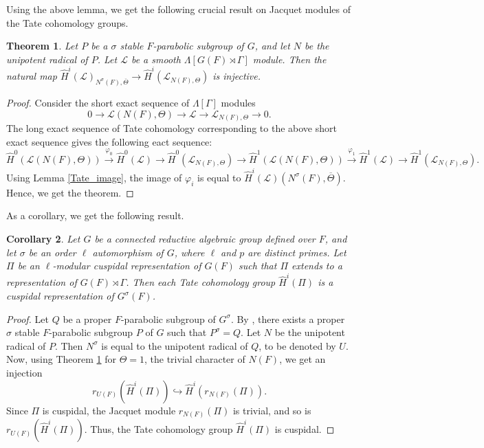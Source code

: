 \documentclass[10pt, reqno]{amsart}
\theoremstyle{plain}
\numberwithin{equation}{section} \newcommand{\di}{\operatorname{dim}}
\newtheorem{theorem}{Theorem}[subsection]
\newtheorem{corollary}[theorem]{Corollary}
\begin{document}
Using the above lemma, we get the following crucial result on Jacquet
modules of the Tate cohomology groups.
\begin{theorem}\label{Jacquet_tate_injective}
Let $P$ be a $\sigma$ stable $F$-parabolic subgroup of
$G$, and let $N$ be the unipotent radical of $P$. Let $\mathcal{L}$
be a smooth $\Lambda[G(F)\rtimes \Gamma]$
module. Then the natural map 
$\widehat{H}^i(\mathcal{L})_{N^\sigma(F),
\overline{\Theta}} \rightarrow
\widehat{H}^i(\mathcal{L}_{N(F),\Theta})$ is injective.  
\end{theorem}
\begin{proof}
Consider the short exact sequence of $\Lambda[\Gamma]$ modules
$$ 0\longrightarrow \mathcal{L}(N(F),\Theta)
\longrightarrow \mathcal{L}\longrightarrow
\mathcal{L}_{N(F),\Theta}\longrightarrow 0. $$ The long exact sequence
of Tate cohomology corresponding to the above short exact sequence gives
the following eact sequence:
$$ \widehat{H}^0(\mathcal{L}(N(F),\Theta))\xrightarrow
{\varphi_0}\widehat{H}^0(\mathcal{L})\rightarrow
\widehat{H}^0(\mathcal{L}_{N(F),\Theta})\rightarrow
\widehat{H}^1(\mathcal{L}(N(F),\Theta))\xrightarrow
{\varphi_1}\widehat{H}^1(\mathcal{L}) \rightarrow\widehat{H}^1
(\mathcal{L}_{N(F),\Theta}). $$ Using Lemma \ref{Tate_image}, the
image of $\varphi_i$ is equal to
$\widehat{H}^i(\mathcal{L})(N^\sigma(F),\overline{\Theta})$. Hence, we
get the theorem.
\end{proof}
As a corollary, we get the following result.
\begin{corollary}\label{Tate_cuspidal}
  Let $G$ be a connected reductive algebraic group defined over $F$,
  and let $\sigma$ be an order $\ell$ automorphism of $G$, where
  $\ell$ and $p$ are distinct primes. Let $\Pi$ be an $\ell$-modular
  cuspidal representation of $G(F)$ such that $\Pi$ extends to a
  representation of $G(F)\rtimes \Gamma$. Then each Tate cohomology
  group $\widehat{H}^i(\Pi)$ is a cuspidal representation of
  $G^\sigma(F)$.
\end{corollary}
\begin{proof}
  Let $Q$ be a proper $F$-parabolic subgroup of $G^\sigma$. By
  \cite[Lemma 12.5.4]{Prasad_Kaletha_Bruhat_Tits}, there exists a
  proper $\sigma$ stable $F$-parabolic subgroup $P$ of $G$ such that
  $P^\sigma = Q$. Let $N$ be the unipotent radical of $P$. Then
  $N^\sigma$ is equal to the unipotent radical of $Q$, to be denoted
  by $U$. Now, using Theorem \ref{Jacquet_tate_injective} for
  $\Theta=1$, the trivial character of $N(F)$, we get an injection
$$ r_{U(F)}(\widehat{H}^i(\Pi)) \hookrightarrow \widehat{H}^i(r_{N(F)}(\Pi)). $$
Since $\Pi$ is cuspidal, the Jacquet module $r_{N(F)}(\Pi)$ is trivial,
and so is $r_{U(F)}(\widehat{H}^i(\Pi))$. Thus, the Tate cohomology group
$\widehat{H}^i(\Pi)$ is cuspidal.
\end{proof}
\end{document}
